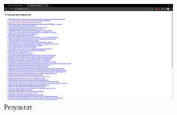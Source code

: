 \documentclass[a4paper, 14pt]{extarticle}
\begin{document}
\newpage



\begin{figure}[!htb]
	\centering
	\includegraphics[width=0.8\textwidth]{result.png}
\caption{Результат}
\label{fig:img1}
\end{figure}
\end{document}
